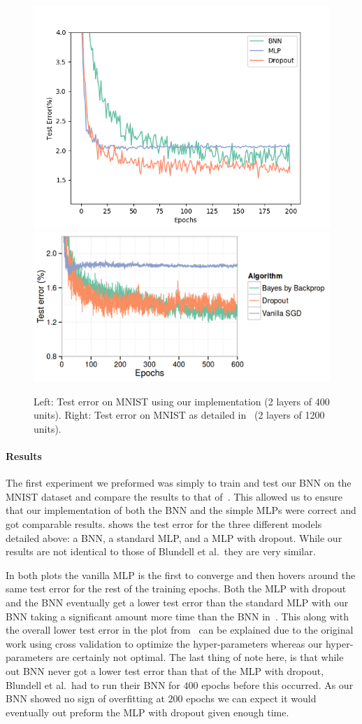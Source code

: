 \documentclass[11pt]{article}
\begin{document}
\begin{figure}
  \centering
  \includegraphics[width=.49\textwidth]{figures/test_error_compare.png}
  \includegraphics[width=.49\textwidth]{figures/test_error_compare_paper.png}
  \caption{Left: Test error on MNIST using our implementation (2 layers of 400
  units).  Right: Test error on MNIST as detailed in~\cite{blundell} (2 layers
  of 1200 units).}\label{fig:mnist_test_error}
\end{figure}
 

\paragraph{Results}

The first experiment we preformed was simply to train and test our BNN on the
MNIST dataset and compare the results to that of~\cite{blundell}. This allowed
us to ensure that our implementation of both the BNN and the simple MLPs were
correct and got comparable results.  shows the
test error for the three different models detailed above: a BNN, a standard
MLP, and a MLP with dropout. While our results are not identical to those of
Blundell et al.\, they are very similar. 

In both plots the vanilla MLP is the first to converge and then hovers around
the same test error for the rest of the training epochs. Both the MLP with
dropout and the BNN eventually get a lower test error than the standard MLP
with our BNN taking a significant amount more time than the BNN
in~\cite{blundell}. This along with the overall lower test error in the plot
from~\cite{blundell} can be explained due to the original work using cross
validation to optimize the hyper-parameters whereas our hyper-parameters are
certainly not optimal. The last thing of note here, is that while out BNN never
got a lower test error than that of the MLP with dropout, Blundell et al.\ had
to run their BNN for $400$ epochs before this occurred. As our BNN showed no
sign of overfitting at $200$ epochs we can expect it would eventually out
preform the MLP with dropout given enough time.
\end{document}
